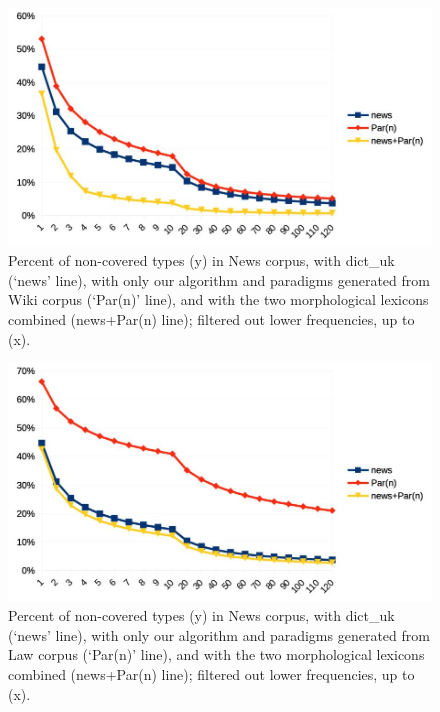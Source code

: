 \documentclass[11pt,a4paper]{article}
\begin{document}
\begin{figure}
	\includegraphics[width=\linewidth]{evaluation-coverage-newsW.jpg}
	\caption{Percent of non-covered types (y) in News corpus, with dict\_uk (`news' line), with only our algorithm and paradigms generated from Wiki corpus (`Par(n)' line), and with the two morphological lexicons combined (news+Par(n) line); filtered out lower frequencies, up to (x).}
	\label{fig:pcNoTypNewsW}
\end{figure}

\begin{figure}
	\includegraphics[width=\linewidth]{evaluation-coverage-newsL.jpg}
	\caption{Percent of non-covered types (y) in News corpus, with dict\_uk (`news' line), with only our algorithm and paradigms generated from Law corpus (`Par(n)' line), and with the two morphological lexicons combined (news+Par(n) line); filtered out lower frequencies, up to (x).}
	\label{fig:pcNoTypNewsL}
\end{figure}
\end{document}
